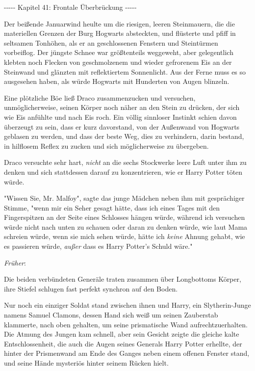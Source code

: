 

\hypertarget{frontale-uxfcberbruxfcckung}{%

-\/-\/-\/-\/- Kapitel 41: Frontale Überbrückung -\/-\/-\/-\/-

Der beißende Januarwind heulte um die riesigen, leeren Steinmauern, die die materiellen Grenzen der Burg Hogwarts absteckten, und flüsterte und pfiff in seltsamen Tonhöhen, als er an geschlossenen Fenstern und Steintürmen vorbeiflog. Der jüngste Schnee war größtenteils weggeweht, aber gelegentlich klebten noch Flecken von geschmolzenem und wieder gefrorenem Eis an der Steinwand und glänzten mit reflektiertem Sonnenlicht. Aus der Ferne muss es so ausgesehen haben, als würde Hogwarts mit Hunderten von Augen blinzeln.

Eine plötzliche Böe ließ Draco zusammenzucken und versuchen, unmöglicherweise, seinen Körper noch näher an den Stein zu drücken, der sich wie Eis anfühlte und nach Eis roch. Ein völlig sinnloser Instinkt schien davon überzeugt zu sein, dass er kurz davorstand, von der Außenwand von Hogwarts geblasen zu werden, und dass der beste Weg, dies zu verhindern, darin bestand, in hilflosem Reflex zu zucken und sich möglicherweise zu übergeben.

Draco versuchte sehr hart, \emph{nicht} an die sechs Stockwerke leere Luft unter ihm zu denken und sich stattdessen darauf zu konzentrieren, wie er Harry Potter töten würde.

"Wissen Sie, Mr. Malfoy", sagte das junge Mädchen neben ihm mit gesprächiger Stimme, "wenn mir ein Seher gesagt hätte, dass ich eines Tages mit den Fingerspitzen an der Seite eines Schlosses hängen würde, während ich versuchen würde nicht nach unten zu schauen oder daran zu denken würde, wie laut Mama schreien würde, wenn sie mich sehen würde, hätte ich \emph{keine} Ahnung gehabt, wie es passieren würde, \emph{außer} dass es Harry Potter's Schuld wäre."

\emph{Früher}:

Die beiden verbündeten Generäle traten zusammen über Longbottoms Körper, ihre Stiefel schlugen fast perfekt synchron auf den Boden.

Nur noch ein einziger Soldat stand zwischen ihnen und Harry, ein Slytherin-Junge namens Samuel Clamons, dessen Hand sich weiß um seinen Zauberstab klammerte, nach oben gehalten, um seine prismatische Wand aufrechtzuerhalten. Die Atmung des Jungen kam schnell, aber sein Gesicht zeigte die gleiche kalte Entschlossenheit, die auch die Augen seines Generals Harry Potter erhellte, der hinter der Prismenwand am Ende des Ganges neben einem offenen Fenster stand, und seine Hände mysteriös hinter seinem Rücken hielt.

}
